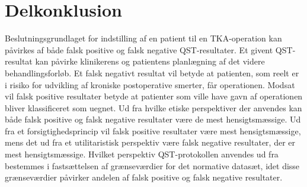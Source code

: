 \section{Delkonklusion}
Beslutningsgrundlaget for indstilling af en patient til en TKA-operation kan påvirkes af både falsk positive og falsk negative QST-resultater. Et givent QST-resultat kan påvirke klinikerens og patientens planlægning af det videre behandlingsforløb. Et falsk negativt resultat vil betyde at patienten, som reelt er i risiko for udvikling af kroniske postoperative smerter, får operationen. Modsat vil falsk positive resultater betyde at patienter som ville have gavn af operationen bliver klassificeret som uegnet. Ud fra hvilke etiske perspektiver der anvendes kan både falsk positive og falsk negative resultater være de mest hensigtsmæssige. Ud fra et forsigtighedsprincip vil falsk positive resultater være mest hensigtsmæssige, mens det ud fra et utilitaristisk perspektiv være falsk negative resultater, der er mest hensigtsmæssige. Hvilket perspektiv QST-protokollen anvendes ud fra bestemmes i fastsættelsen af grænseværdier for det normative datasæt, idet disse grænseværdier påvirker andelen af falsk positive og falsk negative resultater. 

